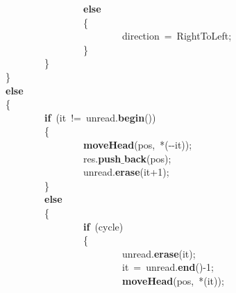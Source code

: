 \mbox{}\ \ \ \ \ \ \ \ \ \ \ \ \ \ \ \ \ \ \ \ \ \ \ \ \ \ \ \ \ \ \ \ \textbf{else} \\
\mbox{}\ \ \ \ \ \ \ \ \ \ \ \ \ \ \ \ \ \ \ \ \ \ \ \ \ \ \ \ \ \ \ \ \{ \\
\mbox{}\ \ \ \ \ \ \ \ \ \ \ \ \ \ \ \ \ \ \ \ \ \ \ \ \ \ \ \ \ \ \ \ \ \ \ \ \ \ \ \ direction\ =\ RightToLeft; \\
\mbox{}\ \ \ \ \ \ \ \ \ \ \ \ \ \ \ \ \ \ \ \ \ \ \ \ \ \ \ \ \ \ \ \ \} \\
\mbox{}\ \ \ \ \ \ \ \ \ \ \ \ \ \ \ \ \ \ \ \ \ \ \ \ \} \\
\mbox{}\ \ \ \ \ \ \ \ \ \ \ \ \ \ \ \ \} \\
\mbox{}\ \ \ \ \ \ \ \ \ \ \ \ \ \ \ \ \textbf{else} \\
\mbox{}\ \ \ \ \ \ \ \ \ \ \ \ \ \ \ \ \{ \\
\mbox{}\ \ \ \ \ \ \ \ \ \ \ \ \ \ \ \ \ \ \ \ \ \ \ \ \textbf{if}\ (it\ !=\ unread.\textbf{begin}()) \\
\mbox{}\ \ \ \ \ \ \ \ \ \ \ \ \ \ \ \ \ \ \ \ \ \ \ \ \{ \\
\mbox{}\ \ \ \ \ \ \ \ \ \ \ \ \ \ \ \ \ \ \ \ \ \ \ \ \ \ \ \ \ \ \ \ \textbf{moveHead}(pos,\ *(-\/-it)); \\
\mbox{}\ \ \ \ \ \ \ \ \ \ \ \ \ \ \ \ \ \ \ \ \ \ \ \ \ \ \ \ \ \ \ \ res.\textbf{push$\_$back}(pos); \\
\mbox{}\ \ \ \ \ \ \ \ \ \ \ \ \ \ \ \ \ \ \ \ \ \ \ \ \ \ \ \ \ \ \ \ unread.\textbf{erase}(it+1); \\
\mbox{}\ \ \ \ \ \ \ \ \ \ \ \ \ \ \ \ \ \ \ \ \ \ \ \ \} \\
\mbox{}\ \ \ \ \ \ \ \ \ \ \ \ \ \ \ \ \ \ \ \ \ \ \ \ \textbf{else} \\
\mbox{}\ \ \ \ \ \ \ \ \ \ \ \ \ \ \ \ \ \ \ \ \ \ \ \ \{ \\
\mbox{}\ \ \ \ \ \ \ \ \ \ \ \ \ \ \ \ \ \ \ \ \ \ \ \ \ \ \ \ \ \ \ \ \textbf{if}\ (cycle) \\
\mbox{}\ \ \ \ \ \ \ \ \ \ \ \ \ \ \ \ \ \ \ \ \ \ \ \ \ \ \ \ \ \ \ \ \{ \\
\mbox{}\ \ \ \ \ \ \ \ \ \ \ \ \ \ \ \ \ \ \ \ \ \ \ \ \ \ \ \ \ \ \ \ \ \ \ \ \ \ \ \ unread.\textbf{erase}(it); \\
\mbox{}\ \ \ \ \ \ \ \ \ \ \ \ \ \ \ \ \ \ \ \ \ \ \ \ \ \ \ \ \ \ \ \ \ \ \ \ \ \ \ \ it\ =\ unread.\textbf{end}()-1; \\
\mbox{}\ \ \ \ \ \ \ \ \ \ \ \ \ \ \ \ \ \ \ \ \ \ \ \ \ \ \ \ \ \ \ \ \ \ \ \ \ \ \ \ \textbf{moveHead}(pos,\ *(it)); \\
